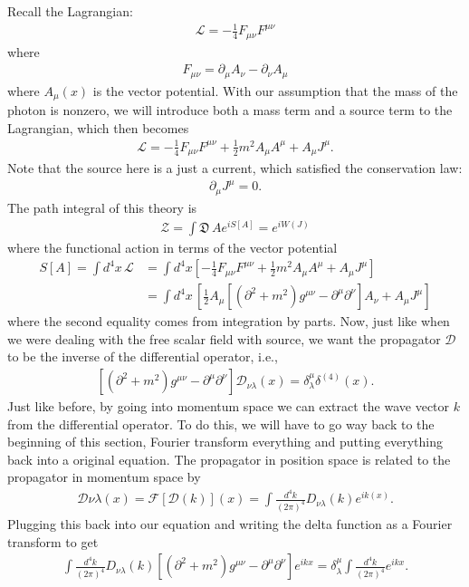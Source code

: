 \documentclass{book}
\theoremstyle{definition}
\newcommand{\p}{\partial}
\newcommand{\lag}{\mathcal{L}}
\newcommand{\F}{\mathcal{F}}
\newcommand{\f}[2]{\frac{#1}{#2}}
\newcommand{\lb}{\left[}
\newcommand{\rb}{\right]}
\newcommand{\D}{\mathcal{D}}
\newcommand{\Z}{\mathcal{Z}}
\begin{document}
Recall the Lagrangian:
\begin{align}
\lag = -\f{1}{4}F_{\mu\nu}F^{\mu\nu}
\end{align}
where
\begin{align}
F_{\mu\nu} = \p_\mu A_\nu - \p_\nu A_\mu
\end{align}
where $A_\mu(x)$ is the vector potential. With our assumption that the mass of the photon is nonzero, we will introduce both a mass term and a source term to the Lagrangian, which then becomes
\begin{align}
\lag = -\f{1}{4}F_{\mu\nu}F^{\mu\nu} + \f{1}{2}m^2A_\mu A^\mu + A_\mu J^\mu.
\end{align}
Note that the source here is a just a current, which satisfied the conservation law:
\begin{align}
\p_\mu J^\mu = 0.
\end{align}
The path integral of this theory is
\begin{align}
\Z = \int \mathfrak{D} \,Ae^{iS[A]} = e^{iW(J)}
\end{align}
where the functional action in terms of the vector potential
\begin{align}
S[A] = \int d^4x\,\lag &= \int d^4x \lb -\f{1}{4}F_{\mu\nu}F^{\mu\nu} + \f{1}{2}m^2A_\mu A^\mu + A_\mu J^\mu \rb \\ 
&= \int d^4x\,\lb \f{1}{2}A_\mu \lb (\p^2 + m^2)g^{\mu\nu} - \p^\mu \p^\nu \rb A_\nu + A_\mu J^\mu  \rb
\end{align}
where the second equality comes from integration by parts. Now, just like when we were dealing with the free scalar field with source, we want the propagator $\D$ to be the inverse of the differential operator, i.e.,
\begin{align}
\lb (\p^2 + m^2)g^{\mu\nu} - \p^\mu \p^\nu \rb \D_{\nu\lambda}(x) = \delta^\mu_\lambda \delta^{(4)}(x).
\end{align}
Just like before, by going into momentum space we can extract the wave vector $k$ from the differential operator. To do this, we will have to go way back to the beginning of this section, Fourier transform everything and putting everything back into a original equation. The propagator in position space is related to the propagator in momentum space by
\begin{align}
\D{\nu\lambda}(x) = \F[\D(k)](x) = \int \f{d^4k}{(2\pi)^4} D_{\nu\lambda}(k)e^{ik(x)}.
\end{align}
Plugging this back into our equation and writing the delta function as a Fourier transform to get
\begin{align}
\int \f{d^4k}{(2\pi)^4}D_{\nu\lambda}(k) \lb (\p^2 + m^2)g^{\mu\nu} - \p^\mu \p^\nu \rb e^{ikx} = \delta^\mu_\lambda \int \f{d^4k}{(2\pi)^4}e^{ikx}.
\end{align}
\end{document}
